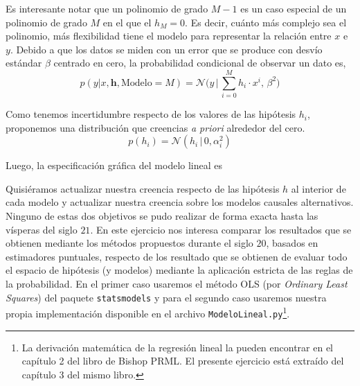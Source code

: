 \documentclass[a4paper,10pt]{article}
\begin{document}
Es interesante notar que un polinomio de grado $M-1$ es un caso especial de un polinomio de grado $M$ en el que el $h_M = 0$.
Es decir, cuánto más complejo sea el polinomio, más flexibilidad tiene el modelo para representar la relación entre $x$ e $y$.
Debido a que los datos se miden con un error que se produce con desvío estándar $\beta$ centrado en cero, la probabilidad condicional de observar un dato es,
$$p(y|x, \bm{h}, \text{Modelo} = M) = \mathcal{N}\bigg(y\, \bigg| \, \sum_{i =  0}^M h_i \cdot x^i , \, \beta^2\bigg) $$

Como tenemos incertidumbre respecto de los valores de las hipótesis $h_i$, proponemos una distribución que creencias \emph{a priori} alrededor del cero.
$$p(h_i) = \mathcal{N}(h_i\, | \, 0, \alpha_i^2) $$

Luego, la especificación gráfica del modelo lineal es
\begin{figure}[H]
    \centering
\end{figure}


Quisiéramos actualizar nuestra creencia respecto de las hipótesis $h$ al interior de cada modelo y actualizar nuestra creencia sobre los modelos causales alternativos.
Ninguno de estas dos objetivos se pudo realizar de forma exacta hasta las vísperas del siglo $21$.
En este ejercicio nos interesa comparar los resultados que se obtienen mediante los métodos propuestos durante el siglo $20$, basados en estimadores puntuales, respecto de los resultado que se obtienen de evaluar todo el espacio de hipótesis (y modelos) mediante la aplicación estricta de las reglas de la probabilidad.
En el primer caso usaremos el método OLS (por \emph{Ordinary Least Squares}) del paquete \texttt{statsmodels} y para el segundo caso usaremos nuestra propia implementación disponible en el archivo \texttt{ModeloLineal.py}\footnote{La derivación matemática de la regresión lineal la pueden encontrar en el capítulo 2 del libro de Bishop PRML. El presente ejercicio está extraído del capítulo 3 del mismo libro.}.
\end{document}
